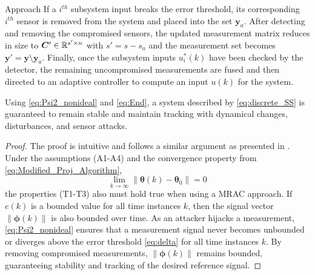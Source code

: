 \begin{section}{Approach}
If a $i^{th}$ subsystem input breaks the error threshold, its corresponding $i^{th}$ sensor is removed from the system and placed into the set $\bm{y}_a$. After detecting and removing the compromised sensors, the updated measurement matrix reduces in size to $\bm{C}' \in \mathbb{R}^{s' \times n}$ with $s'=s-s_a$ and the measurement set becomes $\bm{y}' =\bm{y}\setminus\bm{y}_a$. Finally, once the subsystem inputs $u_i^*(k)$ have been checked by the detector, the remaining uncompromised measurements are fused and then directed to an adaptive controller to compute an input $u(k)$ for the system.

\begin{lemma} 
	\label{lemma_1}
	Using \eqref{eq:Psi2_nonideal} and \eqref{eq:End}, a system described by \eqref{eq:discrete_SS} is guaranteed to remain stable and maintain tracking with dynamical changes, disturbances, and sensor attacks. 

\end{lemma}

\begin{proof}
The proof is intuitive and follows a similar argument as presented in \cite{tao2003adaptive}. Under the assumptions (A1-A4) and the convergence property from \eqref{eq:Modified_Proj_Algorithm},
    \begin{equation}
    \label{lemma_1_eq1}
        \lim_{k\to\infty}\|\bm{\theta}(k)-\bm{\theta}_0\|=0 \nonumber
    \end{equation}
the properties (T1-T3) also must hold true when using a MRAC approach. If $e(k)$ is a bounded value for all time instances $k$, then the signal vector $\lVert{\bm{\phi}}(k) \rVert$ is also bounded over time. As an attacker hijacks a measurement, \eqref{eq:Psi2_nonideal} ensures that a measurement signal never becomes unbounded or diverges above the error threshold \eqref{eq:delta} for all time instances $k$. By removing compromised measurements, $\lVert{\bm{\phi}}(k) \rVert$ remains bounded, guaranteeing stability and tracking of the desired reference signal.
  
\end{proof}








\end{section}

